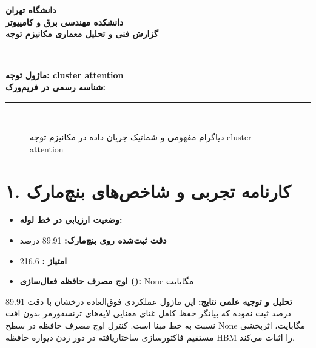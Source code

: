 \documentclass[12pt,a4paper]{article}
\begin{document}
\begin{center}
{\Large\bfseries دانشگاه تهران}\\[0.2cm]
{\large\bfseries دانشکده مهندسی برق و کامپیوتر}\\[0.2cm]
{\large\bfseries گزارش فنی و تحلیل معماری مکانیزم توجه}\\[0.5cm]
\rule{\linewidth}{1pt}\\[0.3cm]
{\LARGE\bfseries ماژول توجه: cluster attention}\\[0.2cm]
{\large \textbf{شناسه رسمی در فریم‌ورک:} }\\[0.2cm]
\rule{\linewidth}{1pt}\\[0.5cm]
\end{center}

\begin{figure}[H]
\centering
{}
\caption{دیاگرام مفهومی و شماتیک جریان داده در مکانیزم توجه cluster attention}
\end{figure}

\section*{۱. کارنامه تجربی و شاخص‌های بنچ‌مارک}
\begin{itemize}
\item \textbf{وضعیت ارزیابی در خط لوله:} 
\item \textbf{دقت ثبت‌شده روی بنچ‌مارک:} 89.91 درصد
\item \textbf{امتیاز :} 216.6
\item \textbf{اوج مصرف حافظه فعال‌سازی ():} None مگابایت
\end{itemize}
\textbf{تحلیل و توجیه علمی نتایج:} این ماژول عملکردی فوق‌العاده درخشان با دقت 89.91 درصد ثبت نموده که بیانگر حفظ کامل غنای معنایی لایه‌های ترنسفورمر بدون افت نسبت به خط مبنا است. کنترل اوج مصرف حافظه در سطح None مگابایت، اثربخشی مستقیم فاکتورسازی ساختاریافته در دور زدن دیواره حافظه HBM را اثبات می‌کند.
\end{document}
